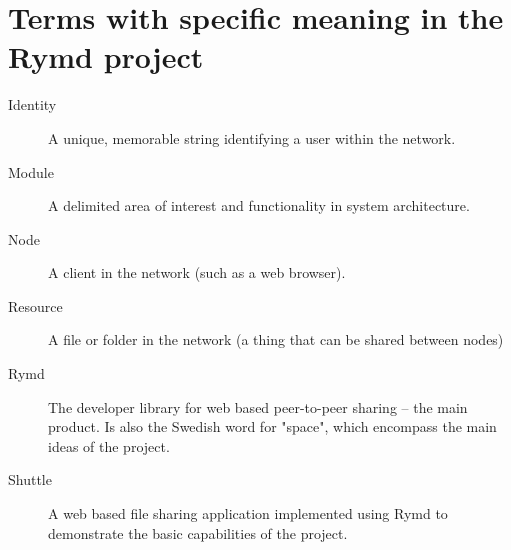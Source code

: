 \section{Terms with specific meaning in the Rymd project}
\begin{description}
  \item[Identity] A unique, memorable string identifying a user within the network.
  \item[Module] A delimited area of interest and functionality in system architecture.
  \item[Node] A client in the network (such as a web browser).
  \item[Resource] A file or folder in the network (a thing that can be shared between nodes)
  \item[Rymd] The developer library for web based peer-to-peer sharing – the main product. Is also the Swedish word for "space", which encompass the main ideas of the project.
  \item[Shuttle] A web based file sharing application implemented using Rymd to demonstrate the basic capabilities of the project.
\end{description}
